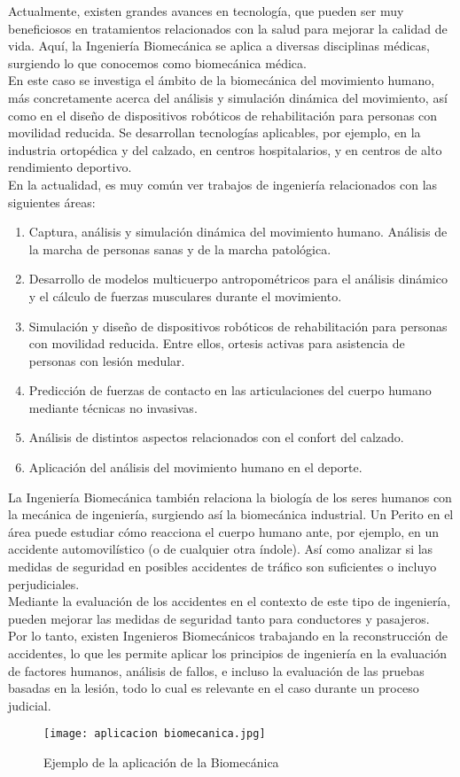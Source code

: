 \documentclass{article}
\begin{document}
Actualmente, existen grandes avances en tecnología, que pueden ser muy beneficiosos en tratamientos relacionados con la salud para mejorar la calidad de vida. Aquí, la Ingeniería Biomecánica se aplica a diversas disciplinas médicas, surgiendo lo que conocemos como biomecánica médica. \\
En este caso se investiga el ámbito de la biomecánica del movimiento humano, más concretamente acerca del análisis y simulación dinámica del movimiento, así como en el diseño de dispositivos robóticos de rehabilitación para personas con movilidad reducida. Se desarrollan tecnologías aplicables, por ejemplo, en la industria ortopédica y del calzado, en centros hospitalarios, y en centros de alto rendimiento deportivo. \cite{ff2} \\
En la actualidad, es muy común ver trabajos de ingeniería relacionados con las siguientes áreas:\cite{ff2}
\begin{enumerate}
    \item Captura, análisis y simulación dinámica del movimiento humano. Análisis de la marcha de personas sanas y de la marcha patológica.
    \item Desarrollo de modelos multicuerpo antropométricos para el análisis dinámico y el cálculo de fuerzas musculares durante el movimiento.
    \item Simulación y diseño de dispositivos robóticos de rehabilitación para personas con movilidad reducida. Entre ellos, ortesis activas para asistencia de personas con lesión medular.
    \item Predicción de fuerzas de contacto en las articulaciones del cuerpo humano mediante técnicas no invasivas.
    \item Análisis de distintos aspectos relacionados con el confort del calzado.
    \item Aplicación del análisis del movimiento humano en el deporte.
\end{enumerate}
La Ingeniería Biomecánica también relaciona la biología de los seres humanos con la mecánica de ingeniería, surgiendo así la biomecánica industrial. Un Perito en el área puede estudiar cómo reacciona el cuerpo humano ante, por ejemplo, en un accidente automovilístico (o de cualquier otra índole). Así como analizar si las medidas de seguridad en posibles accidentes de tráfico son suficientes o incluyo perjudiciales. \cite{ff1} \\
Mediante la evaluación de los accidentes en el contexto de este tipo de ingeniería, pueden mejorar las medidas de seguridad tanto para conductores y pasajeros.\\
Por lo tanto, existen Ingenieros Biomecánicos trabajando en la reconstrucción de accidentes, lo que les permite aplicar los principios de ingeniería en la evaluación de factores humanos, análisis de fallos, e incluso la evaluación de las pruebas basadas en la lesión, todo lo cual es relevante en el caso durante un proceso judicial. \cite{ff1}
\begin{figure} [htp]%
    \centering
    \texttt{[image: aplicacion biomecanica.jpg]} %
    \caption{Ejemplo de la aplicación de la Biomecánica}
    \label{grafica}
\end{figure}
\end{document}

